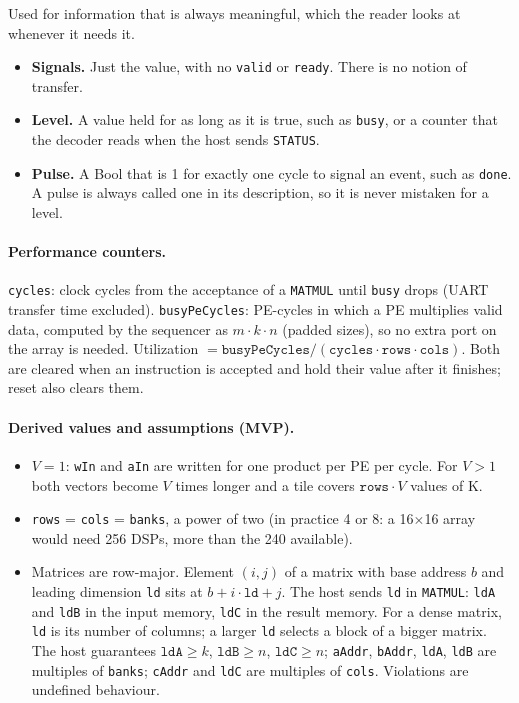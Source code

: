 \documentclass{article}
\begin{document}
Used for information that is always meaningful, which the reader looks at whenever it needs it.

\begin{itemize}
  \item \textbf{Signals.} Just the value, with no \texttt{valid} or \texttt{ready}. There is no notion of transfer.
  \item \textbf{Level.} A value held for as long as it is true, such as \texttt{busy}, or a counter that the decoder reads
        when the host sends \texttt{STATUS}.
  \item \textbf{Pulse.} A Bool that is 1 for exactly one cycle to signal an event, such as \texttt{done}. A pulse is
        always called one in its description, so it is never mistaken for a level.
\end{itemize}

\paragraph{Performance counters.}
\texttt{cycles}: clock cycles from the acceptance of a \texttt{MATMUL} until \texttt{busy} drops (UART transfer time excluded).
\texttt{busyPeCycles}: PE-cycles in which a PE multiplies valid data, computed by the sequencer as $m \cdot k \cdot n$ (padded sizes), so no extra port on the array is needed. Utilization $= \texttt{busyPeCycles} / (\texttt{cycles} \cdot \texttt{rows} \cdot \texttt{cols})$.
Both are cleared when an instruction is accepted and hold their value after it finishes; reset also clears them.

\paragraph{Derived values and assumptions (MVP).}
\begin{itemize}
  \item $V = 1$: \texttt{wIn} and \texttt{aIn} are written for one product per PE per cycle. For $V > 1$ both vectors become $V$ times longer and a tile covers $\texttt{rows}\cdot V$ values of K.
  \item \texttt{rows} = \texttt{cols} = \texttt{banks}, a power of two (in practice 4 or 8: a 16$\times$16 array would need 256 DSPs, more than the 240 available).
  \item Matrices are row-major. Element $(i,j)$ of a matrix with base address $b$ and leading dimension
        \texttt{ld} sits at $b + i\cdot\texttt{ld} + j$. The host sends \texttt{ld} in \texttt{MATMUL}:
        \texttt{ldA} and \texttt{ldB} in the input memory, \texttt{ldC} in the result memory. For a dense
        matrix, \texttt{ld} is its number of columns; a larger \texttt{ld} selects a block of a bigger matrix.
        The host guarantees $\texttt{ldA} \ge k$, $\texttt{ldB} \ge n$, $\texttt{ldC} \ge n$;
        \texttt{aAddr}, \texttt{bAddr}, \texttt{ldA}, \texttt{ldB} are multiples of \texttt{banks};
        \texttt{cAddr} and \texttt{ldC} are multiples of \texttt{cols}. Violations are undefined behaviour.
\end{itemize}
\end{document}
